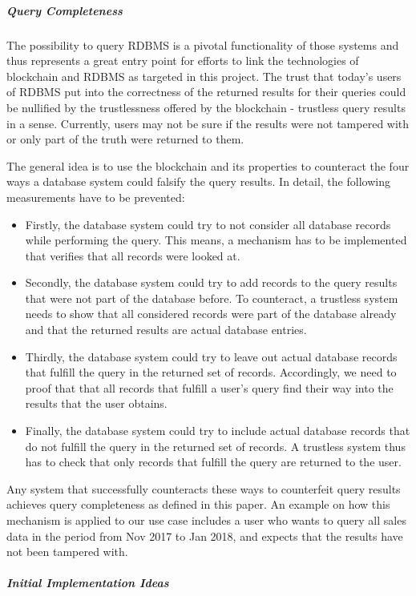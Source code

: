 \subparagraph{Query Completeness}

The possibility to query RDBMS is a pivotal functionality of those systems and thus represents a great entry point for efforts to link the technologies of blockchain and RDBMS as targeted in this project. The trust that today’s users of RDBMS put into the correctness of the returned results for their queries could be nullified by the trustlessness offered by the blockchain - trustless query results in a sense. Currently, users may not be sure if the results were not tampered with or only part of the truth were returned to them.

The general idea is to use the blockchain and its properties to counteract the four ways a database system could falsify the query results. In detail, the following measurements have to be prevented:
\begin{itemize}
	\item Firstly, the database system could try to not consider all database records while performing the query. This means, a mechanism has to be implemented that verifies that all records were looked at.
	\item Secondly, the database system could try to add records to the query results that were not part of the database before. To counteract, a trustless system needs to show that all considered records were part of the database already and that the returned results are actual database entries.
	\item Thirdly, the database system could try to leave out actual database records that fulfill the query in the returned set of records. Accordingly, we need to proof that that all records that fulfill a user’s query find their way into the results that the user obtains.
	\item Finally, the database system could try to include actual database records that do not fulfill the query in the returned set of records. A trustless system thus has to check that only records that fulfill the query are returned to the user.
\end{itemize}

Any system that successfully counteracts these ways to counterfeit query results achieves query completeness as defined in this paper. An example on how this mechanism is applied to our use case includes a user who wants to query all sales data in the period from Nov 2017 to Jan 2018, and expects that the results have not been tampered with.

\subparagraph{Initial Implementation Ideas}

